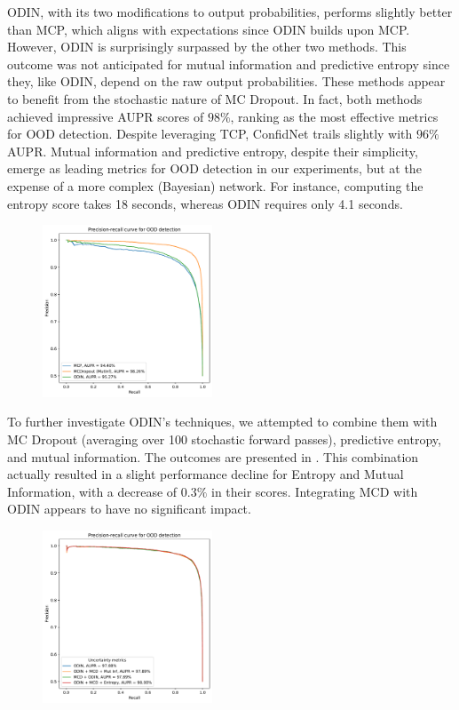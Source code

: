 ODIN, with its two modifications to output probabilities, performs slightly better than MCP, which aligns with expectations since ODIN builds upon MCP. However, ODIN is surprisingly surpassed by the other two methods. This outcome was not anticipated for mutual information and predictive entropy since they, like ODIN, depend on the raw output probabilities. These methods appear to benefit from the stochastic nature of MC Dropout. In fact, both methods achieved impressive AUPR scores of $98\%$, ranking as the most effective metrics for OOD detection. Despite leveraging TCP, ConfidNet trails slightly with $96\%$ AUPR. Mutual information and predictive entropy, despite their simplicity, emerge as leading metrics for OOD detection in our experiments, but at the expense of a more complex (Bayesian) network. For instance, computing the entropy score takes 18 seconds, whereas ODIN requires only 4.1 seconds.
\begin{figure}[H]
    \centering
    \includegraphics[width=0.45\textwidth]{OOD_aupr.pdf}
    \caption{}
    \label{fig:OOD_aupr}
\end{figure}

To further investigate ODIN's techniques, we attempted to combine them with MC Dropout (averaging over 100 stochastic forward passes), predictive entropy, and mutual information. The outcomes are presented in . This combination actually resulted in a slight performance decline for Entropy and Mutual Information, with a decrease of $0.3\%$ in their scores. Integrating MCD with ODIN appears to have no significant impact. 
\begin{figure}[H]
    \centering
    \includegraphics[width=0.45\textwidth]{OOD_aupr_combo.pdf}
    \caption{}
    \label{fig:OOD_aupr_combo}
\end{figure}

